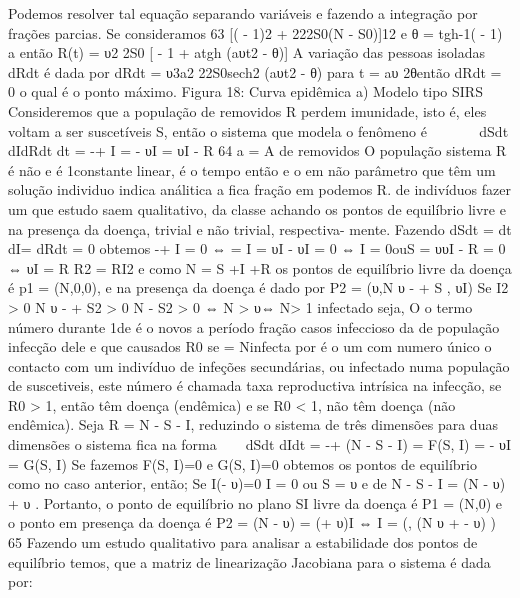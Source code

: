 {{{{{{{{{{{{{{{{{{{{{Podemos resolver tal equação separando variáveis e fazendo a integração por frações parcias. Se consideramos 
63 
[( - 1)2 
+ 222S0(N - S0)]12 e 
θ = tgh-1( - 1) 
a então 
R(t) = υ2 
\beta2S0 
[ - 1 + atgh 
(aυt2 - θ)] A variação das pessoas isoladas dRdt é dada por 
dRdt = υ3a2 
2\beta2S0sech2 (aυt2 - θ) para t = aυ 2θentão dRdt = 0 o qual é o ponto máximo. 
Figura 18: Curva epidêmica 
a) Modelo tipo SIRS 
Consideremos que a população de removidos R perdem imunidade, isto é, eles voltam a ser suscetíveis S, então o sistema que modela o fenômeno é 
 
dSdt dIdRdt dt = -\betaSI + \gamma I = \betaSI - υI 
= υI - \gamma R 
64 
a = 
A de removidos O população sistema R é não e é \gamma  1constante linear, é o tempo então e o em não parâmetro que têm um solução individuo \gamma  indica análitica a fica fração em podemos R. 
de indivíduos fazer um que estudo saem qualitativo, da classe 
achando os pontos de equilíbrio livre e na presença da doença, trivial e não trivial, respectiva- mente. 
Fazendo dSdt = dt dI= dRdt = 0 obtemos 
-\betaSI + \gamma I = 0 ⇔ \betaSI = \gamma I = υI 
\betaSI - υI = 0 ⇔ I = 0ouS = υ\beta υI - \gamma R = 0 ⇔ υI = R \gamma \Rightarrow  R2 = R\gamma I2 e como N = S +I +R os pontos de equilíbrio livre da doença é p1 = (N,0,0), e na presença 
da doença é dado por P2 = 
(υ\beta,\gamma N υ - + S 
, υI) 
Se 
I2 > 0 \Rightarrow  \gamma N υ - + S2 
\gamma  > 0 \Rightarrow  N - S2 > 0 ⇔ N > υ\beta ⇔ N > 1 infectado seja, O o termo número durante \beta\gamma  1de é o novos a período fração casos infeccioso da de população infecção dele e que causados R0 se = Ninfecta  por é o um com numero único o contacto com um indivíduo de infeções secundárias, ou infectado numa população de suscetiveis, este número é chamada taxa reproductiva intrísica na infecção, se R0 > 1, então têm doença (endêmica) e se R0 < 1, não têm doença (não endêmica). 
Seja R = N - S - I, reduzindo o sistema de três dimensões para duas dimensões o sistema fica na forma 
 
dSdt dIdt = -\betaSI + \gamma (N - S - I) = F(S, I) = \betaSI - υI = G(S, I) 
Se fazemos F(S, I)=0 e G(S, I)=0 obtemos os pontos de equilíbrio como no caso anterior, então; 
Se I(\betaS - υ)=0 \Rightarrow  I = 0 ou S = υ\beta 
e de \gamma N - \gamma S - \gamma I = \betaSI \Rightarrow  \gamma  
(N - υ\beta) \gamma  + υ . Portanto, o ponto de equilíbrio no plano SI livre da doença é P1 = (N,0) e o ponto em 
presença da doença é P2 = 
(N - υ\beta) 
= (\gamma  + υ)I ⇔ I = 
\gamma  
(, \gamma (N υ + - \gamma  
υ) 
) 
65 
Fazendo um estudo qualitativo para analisar a estabilidade dos pontos de equilíbrio temos, que a matriz de linearização Jacobiana para o sistema é dada por: 
}}}}}}}}}}}}}}}}}}}}}
